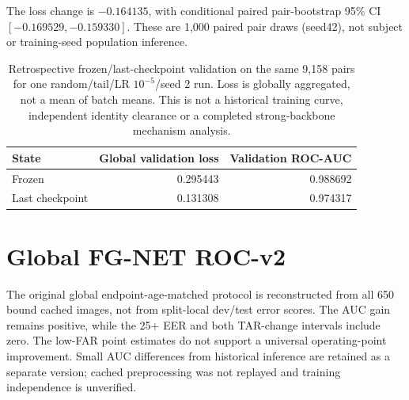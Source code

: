 \documentclass[journal]{IEEEtran}
\begin{document}
The loss change is $-0.164135$, with conditional paired pair-bootstrap 95\% CI $[-0.169529,-0.159330]$. These are 1,000 paired pair draws (seed42), not subject or training-seed population inference.
\begin{table}[!t]
\caption{Retrospective frozen/last-checkpoint validation on the same 9,158 pairs for one random/tail/LR $10^{-5}$/seed 2 run. Loss is globally aggregated, not a mean of batch means. This is not a historical training curve, independent identity clearance or a completed strong-backbone mechanism analysis.}
\label{tab:retrospective-validation-loss}
\centering\footnotesize
\begin{tabular}{lrr}
\toprule
State & Global validation loss & Validation ROC-AUC \\
\midrule
Frozen & 0.295443 & 0.988692 \\
Last checkpoint & 0.131308 & 0.974317 \\
\bottomrule
\end{tabular}
\end{table}

\section{Global FG-NET ROC-v2}\label{sec:fgnet-roc-v2}
The original global endpoint-age-matched protocol is reconstructed from all 650 bound cached images,
not from split-local dev/test error scores. The AUC gain remains positive, while the 25+ EER and
both TAR-change intervals include zero. The low-FAR point estimates do not support a universal
operating-point improvement. Small AUC differences from historical inference are retained as a
separate version; cached preprocessing was not replayed and training independence is unverified.
\end{document}
